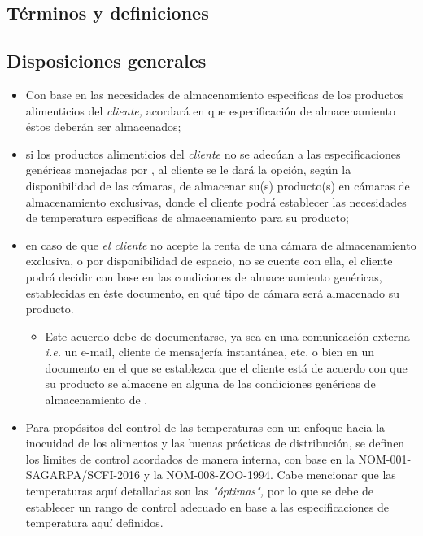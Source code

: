 \subsection{Términos y definiciones}

\begin{description}
\end{description}

\subsection{Disposiciones generales}

\begin{itemize}
	\item Con base en las necesidades de almacenamiento especificas de los productos alimenticios del \emph{cliente,}  acordará en que especificación de almacenamiento éstos deberán ser almacenados;
	\item si los productos alimenticios del \emph{cliente} no se adecúan a las especificaciones genéricas manejadas por , al cliente se le dará la opción, según la disponibilidad de las cámaras, de almacenar su(s) producto(s) en cámaras de almacenamiento exclusivas, donde el cliente podrá establecer las necesidades de temperatura especificas de almacenamiento para su producto;
	\item en caso de que \emph{el cliente} no acepte la renta de una cámara de almacenamiento exclusiva, o por disponibilidad de espacio, no se cuente con ella, el cliente podrá decidir con base en las condiciones de almacenamiento genéricas, establecidas en éste documento, en qué tipo de cámara será almacenado su producto.
	\begin{itemize}
		\item Este acuerdo debe de documentarse, ya sea en una comunicación externa \emph{i.e.} un e-mail, cliente de mensajería instantánea, etc. o bien en un documento en el que se establezca que el cliente está de acuerdo con que su producto se almacene en alguna de las condiciones genéricas de almacenamiento de .
	\end{itemize}
	\item Para propósitos del control de las temperaturas con un enfoque hacia la inocuidad de los alimentos y las buenas prácticas de distribución, se definen los limites de control acordados de manera interna, con base en la NOM-001-SAGARPA/SCFI-2016 y la NOM-008-ZOO-1994. Cabe mencionar que las temperaturas aquí detalladas son las \emph{"óptimas",} por lo que se debe de establecer un rango de control adecuado en base a las especificaciones de temperatura aquí definidos.
\end{itemize}

